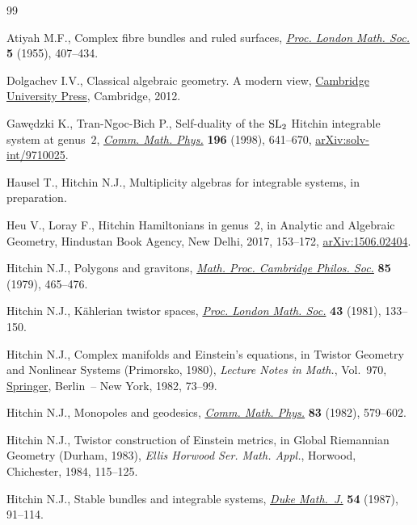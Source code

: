 \begin{thebibliography}{99}
\footnotesize\itemsep=0pt

Atiyah M.F., Complex fibre bundles and ruled surfaces, \href{https://doi.org/10.1112/plms/s3-5.4.407}{\textit{Proc. London
 Math. Soc.}} \textbf{5} (1955), 407--434.

Dolgachev I.V., Classical algebraic geometry. A modern view, \href{https://doi.org/10.1017/CBO9781139084437}{Cambridge
 University Press}, Cambridge, 2012.

Gaw\k{e}dzki K., Tran-Ngoc-Bich P., Self-duality of the {${\rm SL}_2$}
 {H}itchin integrable system at genus~{$2$}, \href{https://doi.org/10.1007/s002200050438}{\textit{Comm. Math. Phys.}}
 \textbf{196} (1998), 641--670, \href{https://arxiv.org/abs/solv-int/9710025}{arXiv:solv-int/9710025}.

Hausel T., Hitchin N.J., Multiplicity algebras for integrable systems, in
 preparation.

Heu V., Loray F., Hitchin {H}amiltonians in genus~2, in Analytic and Algebraic
 Geometry, Hindustan Book Agency, New Delhi, 2017, 153--172,
 \href{https://arxiv.org/abs/1506.02404}{arXiv:1506.02404}.

Hitchin N.J., Polygons and gravitons, \href{https://doi.org/10.1017/S0305004100055924}{\textit{Math. Proc. Cambridge Philos.
 Soc.}} \textbf{85} (1979), 465--476.

Hitchin N.J., K\"ahlerian twistor spaces, \href{https://doi.org/10.1112/plms/s3-43.1.133}{\textit{Proc. London Math. Soc.}}
 \textbf{43} (1981), 133--150.

Hitchin N.J., Complex manifolds and {E}instein's equations, in Twistor Geometry
 and Nonlinear Systems ({P}rimorsko, 1980), \textit{Lecture Notes in Math.},
 Vol.~970, \href{https://doi.org/10.1007/BFb0066025}{Springer}, Berlin~-- New York, 1982, 73--99.

Hitchin N.J., Monopoles and geodesics, \href{https://doi.org/10.1007/BF01208717}{\textit{Comm. Math. Phys.}} \textbf{83}
 (1982), 579--602.

Hitchin N.J., Twistor construction of {E}instein metrics, in Global
 {R}iemannian Geometry ({D}urham, 1983), \textit{Ellis Horwood Ser. Math. Appl.},
 Horwood, Chichester, 1984, 115--125.

Hitchin N.J., Stable bundles and integrable systems, \href{https://doi.org/10.1215/S0012-7094-87-05408-1}{\textit{Duke Math.~J.}}
 \textbf{54} (1987), 91--114.


\end{thebibliography}

